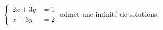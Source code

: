 $\begin{cases}2x+3y &= 1 \\ x+3y &= 2\end{cases}$ admet une infinité de solutions.

\begin{reponses}
\end{reponses}

